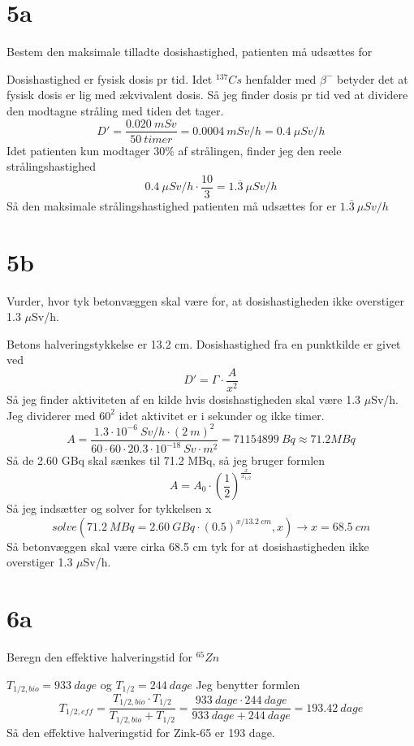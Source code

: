 \documentclass[12pt]{article}
\begin{document}
\section*{5a}

Bestem den maksimale tilladte dosishastighed, patienten må udsættes for

Dosishastighed er fysisk dosis pr tid. Idet $^{137}Cs$ henfalder med $\beta^{-}$ betyder det at fysisk dosis er lig med ækvivalent dosis. Så jeg finder dosis pr tid ved at dividere den modtagne stråling med tiden det tager.
$$D' = \frac{0.020\ mSv}{50\ timer} = 0.0004\ mSv/h = 0.4\ \mu Sv/h$$
Idet patienten kun modtager 30\% af strålingen, finder jeg den reele strålingshastighed
$$0.4\ \mu Sv/h \cdot \frac{10}{3} = 1.\overline{3}\ \mu Sv/h$$
Så den maksimale strålingshastighed patienten må udsættes for er $1.\overline{3}\ \mu Sv/h$

\section*{5b}

Vurder, hvor tyk betonvæggen skal være for, at dosishastigheden ikke overstiger 1.3 $\mu$Sv/h.

Betons halveringstykkelse er 13.2 cm. Dosishastighed fra en punktkilde er givet ved
$$D' = \Gamma\cdot\frac{A}{x^2}$$
Så jeg finder aktiviteten af en kilde hvis dosishastigheden skal være 1.3 $\mu$Sv/h. Jeg dividerer med $60^2$ idet aktivitet er i sekunder og ikke timer.
$$A = \frac{1.3\cdot 10^{-6}\ Sv/h\cdot (2\ m)^2}{60\cdot 60\cdot 20.3\cdot 10^{-18}\ Sv\cdot m^2} = 71154899\ Bq \approx 71.2 MBq$$
Så de 2.60 GBq skal sænkes til 71.2 MBq, så jeg bruger formlen
$$A = A_0 \cdot \left( \frac{1}{2} \right) ^{\frac{x}{x_{1/2}}}$$
Så jeg indsætter og solver for tykkelsen x
$$solve(71.2\ MBq = 2.60\ GBq\cdot (0.5)^{x/13.2\ cm},x) \rightarrow x = 68.5\ cm$$
Så betonvæggen skal være cirka 68.5 cm tyk for at dosishastigheden ikke overstiger 1.3 $\mu$Sv/h.

\section*{6a}

Beregn den effektive halveringstid for $^{65}Zn$

$T_{1/2,bio} = 933\ dage$ og $T_{1/2} = 244\ dage$
Jeg benytter formlen
$$T_{1/2,eff} = \frac{T_{1/2,bio}\cdot T_{1/2}}{T_{1/2,bio}+T_{1/2}} = \frac{933\ dage\cdot 244\ dage}{933\ dage + 244\ dage} = 193.42\ dage$$
Så den effektive halveringstid for Zink-65 er 193 dage.
\end{document}
